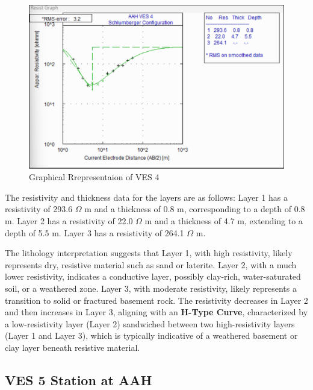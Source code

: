 \documentclass[12pt,a4paper]{report}
\begin{document}
\begin{figure}[H]
    \centering
    \includegraphics[width=1.0\textwidth]{aah_ves4.png}
    \caption{Graphical Rrepresentaion of VES 4}
    \label{fig:AAH_VES_4_Curve}
\end{figure}
The resistivity and thickness data for the layers are as follows: Layer 1 has a resistivity of 293.6 $\Omega$ m and a thickness of 0.8 m, corresponding to a depth of 0.8 m. Layer 2 has a resistivity of 22.0 $\Omega$ m and a thickness of 4.7 m, extending to a depth of 5.5 m. Layer 3 has a resistivity of 264.1 $\Omega$ m.

The lithology interpretation suggests that Layer 1, with high resistivity, likely represents dry, resistive material such as sand or laterite. Layer 2, with a much lower resistivity, indicates a conductive layer, possibly clay-rich, water-saturated soil, or a weathered zone. Layer 3, with moderate resistivity, likely represents a transition to solid or fractured basement rock. The resistivity decreases in Layer 2 and then increases in Layer 3, aligning with an \textbf{H-Type Curve}, characterized by a low-resistivity layer (Layer 2) sandwiched between two high-resistivity layers (Layer 1 and Layer 3), which is typically indicative of a weathered basement or clay layer beneath resistive material.

\subsection{VES 5 Station at AAH}
\end{document}
